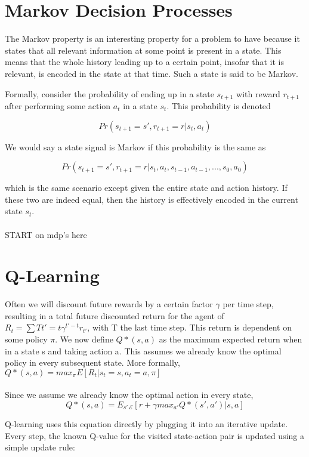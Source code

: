 \section{Markov Decision Processes}
The Markov property is an interesting property for a problem to have
because it states that all relevant information at some point
is present in a state.
This means that the whole history leading up to a certain point,
insofar that it is relevant,
is encoded in the state at that time. 
Such a state is said to be Markov.

Formally, consider the probability of ending up in a state $s_{t+1}$
with reward $r_{t+1}$
after performing some action $a_t$
in a state $s_t$.
This probability is denoted

$$Pr(s_{t+1}=s', r_{t+1}=r | s_t, a_t)$$

We would say a state signal is Markov if this probability is the same as

$$Pr(s_{t+1}=s', r_{t+1}=r | s_t, a_t, s_{t-1}, a_{t-1},..., s_0, a_0)$$

which is the same scenario except given the entire state and action history. If these two are indeed equal, then the history is effectively encoded in the current state $s_t$.

\paragraph{}
START on mdp's here

\section{Q-Learning}
Often we will discount future rewards
by a certain factor $\gamma$ per time step,
resulting in a total future discounted return
for the agent of
$R_t = \sum{T}{t'=t} \gamma^{t'-t}r_{t'}$,
with T the last time step.
This return is dependent on some policy $\pi$.
We now define $Q*(s,a)$ as the maximum expected return
when in a state s and taking action a.
This assumes we already know the optimal policy
in every subsequent state.
More formally,
$Q*(s,a) = max_{\pi}E[R_t|s_t=s, a_t=a, \pi]$

\paragraph{}
Since we assume we already know the optimal action in every state,
$$Q*(s,a) = E_{s'~\mathcal{E}}[r+\gamma max_{a'}Q*(s',a')|s,a]$$

Q-learning uses this equation directly
by plugging it into an iterative update.
Every step, the known Q-value for the visited state-action pair
is updated using a simple update rule:

